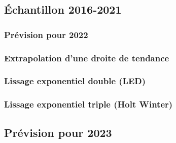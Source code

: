 \subsection{Échantillon 2016-2021}
\subsubsection{Prévision pour 2022}
\subsubsection*{Extrapolation d'une droite de tendance}
\subsubsection*{Lissage exponentiel double (LED)}
\subsubsection*{Lissage exponentiel triple (Holt Winter)}
\subsection{Prévision pour 2023}